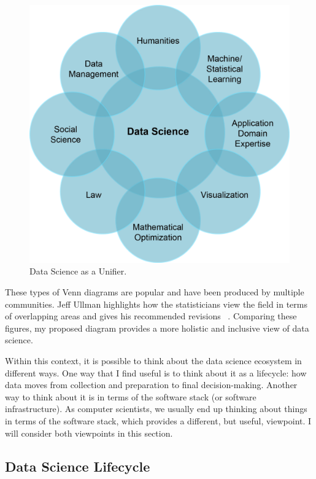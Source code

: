 \documentclass[11pt]{article}
\begin{document}
\begin{figure}[h]
	\centering
	\includegraphics[scale=0.125]{letters/Figures/Unification.jpg}
	\caption{Data Science as a Unifier.}
	\label{fig:unify}
\end{figure}

These types of Venn diagrams are popular and have been produced by multiple communities. Jeff Ullman highlights how the statisticians view the field in terms of overlapping areas and gives his recommended revisions ~\cite{Ullman:2020aa}. Comparing these figures, my proposed diagram provides a more holistic and inclusive view of data science. 

Within this context, it is possible to think about the data science ecosystem in different ways. One way that I find useful is to think about it as a lifecycle: how data moves from collection and preparation to final decision-making. Another way to think about it is in terms of the software stack (or software infrastructure). As computer scientists, we usually end up thinking about things in terms of the software stack, which provides a different, but useful, viewpoint. I will consider both viewpoints in this section.

\subsection{Data Science Lifecycle}\label{sec:lifecycle}
\end{document}
